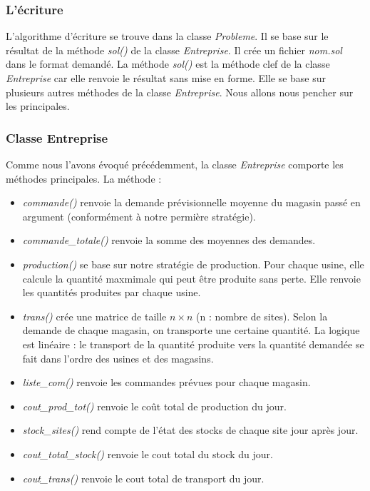 \documentclass[12pt, a4paper]{article}
\begin{document}
\subsubsection{L'écriture}
L'algorithme d'écriture se trouve dans la classe \emph{Probleme}. Il se base sur le résultat de la méthode \emph{sol()} de la classe \emph{Entreprise}. Il crée un fichier \emph{nom.sol} dans le format demandé. La méthode \emph{sol()} est la méthode clef de la classe \emph{Entreprise} car elle renvoie le résultat sans mise en forme. Elle se base sur plusieurs autres méthodes de la classe \emph{Entreprise}. Nous allons nous pencher sur les principales.

\subsubsection{Classe Entreprise}
Comme nous l'avons évoqué précédemment, la classe \emph{Entreprise} comporte les méthodes principales.
La méthode :
\begin{itemize}
\item \emph{commande()} renvoie la demande prévisionnelle moyenne du magasin passé en argument (conformément à notre permière stratégie).
\item \emph{commande\_totale()} renvoie la somme des moyennes des demandes.
\item \emph{production()} se base sur notre stratégie de production. Pour chaque usine, elle calcule la quantité maxmimale qui peut être produite sans perte. Elle renvoie les quantités produites par chaque usine.
\item \emph{trans()} crée une matrice de taille $n\times n$ (n : nombre de sites). Selon la demande de chaque magasin, on transporte une certaine quantité. La logique est linéaire : le transport de la quantité produite vers la quantité demandée se fait dans l'ordre des usines et des magasins.
\item \emph{liste\_com()} renvoie les commandes prévues pour chaque magasin.
\item \emph{cout\_prod\_tot()} renvoie le coût total de production du jour.
\item \emph{stock\_sites()} rend compte de l'état des stocks de chaque site jour après jour.
\item \emph{cout\_total\_stock()} renvoie le cout total du stock du jour.
\item\emph{cout\_trans()} renvoie le cout total de transport du jour.
\end{itemize}
\end{document}
